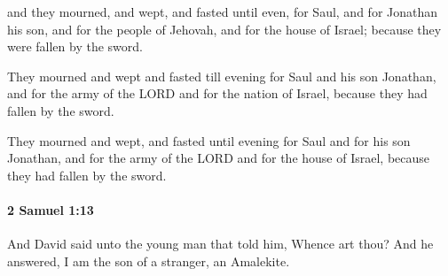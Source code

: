 			\begin{versebox}
					\item[BHS] 
					\item[ASV] and they mourned, and wept, and fasted until even, for Saul, and for Jonathan his son, and for the people of Jehovah, and for the house of Israel; because they were fallen by the sword.
					\item[NIV] They mourned and wept and fasted till evening for Saul and his son Jonathan, and for the army of the LORD and for the nation of Israel, because they had fallen by the sword.
					\item[NRSV] They mourned and wept, and fasted until evening for Saul and for his son Jonathan, and for the army of the LORD and for the house of Israel, because they had fallen by the sword.
			\end{versebox}

		\paragraph{2 Samuel 1:13} %
			\label{2SAMUEL-1-13}

			And David said unto the young man that told him, Whence art thou? And he answered, I am the son of a stranger, an Amalekite.

